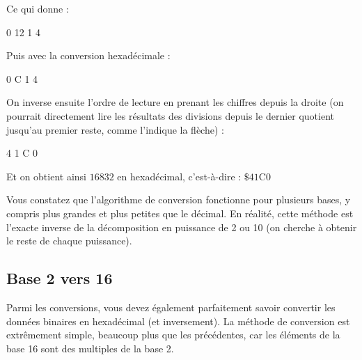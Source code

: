 \documentclass[11pt,a4paper]{article}
\begin{document}
Ce qui donne :

\medskip

{ 0 \hspace*{0.2cm} 12 \hspace*{0.2cm} 1 \hspace*{0.2cm} 4 }

\medskip

Puis avec la conversion hexadécimale :

\medskip

{ 0 \hspace*{0.2cm} C \hspace*{0.2cm} 1 \hspace*{0.2cm} 4 }

\medskip

On inverse ensuite l'ordre de lecture en prenant les chiffres depuis la droite (on pourrait directement lire les résultats des divisions depuis le dernier quotient jusqu'au premier reste, comme l'indique la flèche) :

\medskip

{ 4 \hspace*{0.2cm} 1 \hspace*{0.2cm} C \hspace*{0.2cm} 0 }

\medskip

Et on obtient ainsi $ 16832 $ en hexadécimal, c'est-à-dire : $ \$ 41\text{C}0 $

\bigskip

Vous constatez que l'algorithme de conversion fonctionne pour plusieurs bases, y compris plus grandes et plus petites que le décimal.
En réalité, cette méthode est l'exacte inverse de la décomposition en puissance de 2 ou 10 (on cherche à obtenir le reste de chaque puissance).

\bigskip


\subsection{Base 2 vers 16}

\bigskip

Parmi les conversions, vous devez également parfaitement savoir convertir les données binaires en hexadécimal (et inversement).
La méthode de conversion est extrêmement simple, beaucoup plus que les précédentes, car les éléments de la base 16 sont des multiples de la base 2.

\bigskip
\end{document}
